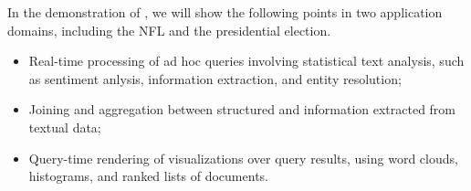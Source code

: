 
In the demonstration of \system, we will show the 
following points in two application domains, including the NFL
and the presidential election.
\begin{itemize}
\item Real-time processing of ad hoc queries 
involving statistical text analysis, such as sentiment anlysis,
information extraction, and entity resolution;
\item Joining and aggregation between structured and information extracted
from textual data;
\item Query-time rendering of visualizations over query results, using 
word clouds, histograms, and ranked lists of documents.
\end{itemize}

